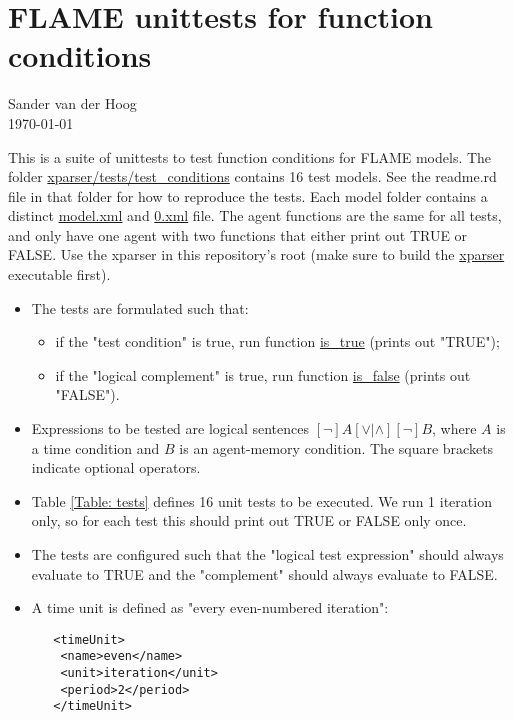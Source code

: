 \documentclass[11pt,a4paper]{article}
\begin{document}
\section{FLAME unittests for function conditions}
Sander van der Hoog\\
\today

\bigskip
This is a suite of unittests to test function conditions for FLAME models.
The folder \url{xparser/tests/test_conditions} contains 16 test models. 
See the readme.rd file in that folder for how to reproduce the tests. 
Each model folder contains a distinct \url{model.xml} and \url{0.xml} file.
The agent functions are the same for all tests, and only have one agent with two functions that either print out TRUE or FALSE.
Use the xparser in this repository's root (make sure to build the \url{xparser} executable first).


\bigskip
\begin{itemize}
\item The tests are formulated such that:
\begin{itemize}
\item if the "test condition" is true, run function \url{is_true} (prints out "TRUE");
\item if the "logical complement" is true, run function \url{is_false} (prints out "FALSE").
\end{itemize}

\item Expressions to be tested are logical sentences $[\neg]A [\lor|\land] [\neg]B$, where $A$ is a time condition and $B$ is an agent-memory condition.
The square brackets indicate optional operators.

\item Table \ref{Table: tests} defines 16 unit tests to be executed. We run 1 iteration only, so for each test this should print out TRUE or FALSE only once.

\item The tests are configured such that the "logical test expression" should always evaluate to TRUE and the "complement" should always evaluate to FALSE.

\item A time unit is defined as "every even-numbered iteration":

\smallskip
\begin{boxedminipage}{7cm}
\begin{lstlisting}
   <timeUnit>
    <name>even</name>
    <unit>iteration</unit>
    <period>2</period>
   </timeUnit>
\end{lstlisting}
\end{boxedminipage}
\end{itemize}
\end{document}
